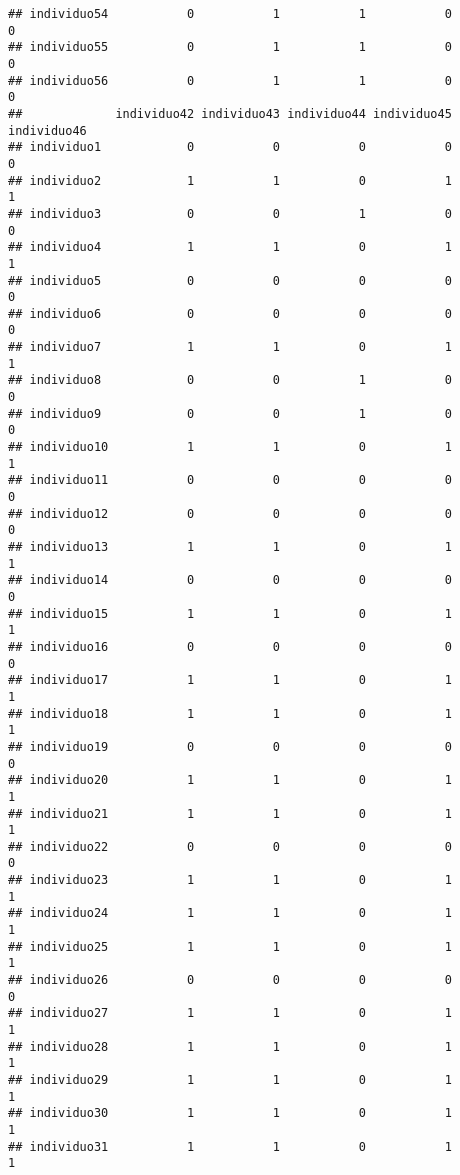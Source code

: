 \documentclass[
]{article}
\begin{document}
\begin{verbatim}
## individuo54           0           1           1           0           0
## individuo55           0           1           1           0           0
## individuo56           0           1           1           0           0
##             individuo42 individuo43 individuo44 individuo45 individuo46
## individuo1            0           0           0           0           0
## individuo2            1           1           0           1           1
## individuo3            0           0           1           0           0
## individuo4            1           1           0           1           1
## individuo5            0           0           0           0           0
## individuo6            0           0           0           0           0
## individuo7            1           1           0           1           1
## individuo8            0           0           1           0           0
## individuo9            0           0           1           0           0
## individuo10           1           1           0           1           1
## individuo11           0           0           0           0           0
## individuo12           0           0           0           0           0
## individuo13           1           1           0           1           1
## individuo14           0           0           0           0           0
## individuo15           1           1           0           1           1
## individuo16           0           0           0           0           0
## individuo17           1           1           0           1           1
## individuo18           1           1           0           1           1
## individuo19           0           0           0           0           0
## individuo20           1           1           0           1           1
## individuo21           1           1           0           1           1
## individuo22           0           0           0           0           0
## individuo23           1           1           0           1           1
## individuo24           1           1           0           1           1
## individuo25           1           1           0           1           1
## individuo26           0           0           0           0           0
## individuo27           1           1           0           1           1
## individuo28           1           1           0           1           1
## individuo29           1           1           0           1           1
## individuo30           1           1           0           1           1
## individuo31           1           1           0           1           1

\end{verbatim}
\end{document}
